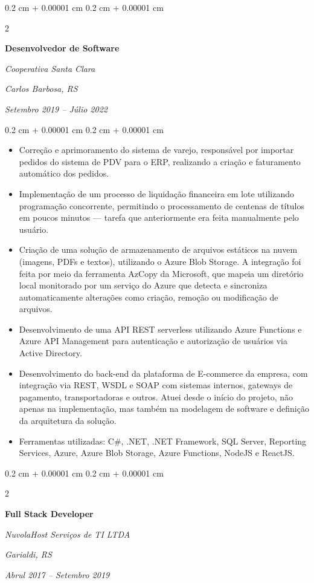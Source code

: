 \documentclass[10pt, letterpaper]{article}
\newenvironment{highlights}{
    \begin{itemize}[
        topsep=0.10 cm,
        parsep=0.10 cm,
        partopsep=0pt,
        itemsep=0pt,
        leftmargin=0.4 cm + 10pt
    ]
}{
    \end{itemize}
} %
\newenvironment{onecolentry}{
    \begin{adjustwidth}{
        0.2 cm + 0.00001 cm
    }{
        0.2 cm + 0.00001 cm
    }
}{
    \end{adjustwidth}
} %
\newenvironment{twocolentry}[2][]{
    \onecolentry
    \def\secondColumn{#2}
    \setcolumnwidth{\fill, 4.5 cm}
    \begin{paracol}{2}
}{
    \switchcolumn \raggedleft \secondColumn
    \end{paracol}
    \endonecolentry
} %
\begin{document}
        \begin{twocolentry}{
        \textit{Carlos Barbosa, RS}    
            
        \textit{Setembro 2019 – Júlio 2022}}
            \textbf{Desenvolvedor de Software}
            
            \textit{Cooperativa Santa Clara}
        \end{twocolentry}

        \vspace{0.10 cm}
        \begin{onecolentry}
            \begin{highlights}
                \item Correção e aprimoramento do sistema de varejo, responsável por importar pedidos do sistema de PDV para o ERP, realizando a criação e faturamento automático dos pedidos.
                \item Implementação de um processo de liquidação financeira em lote utilizando programação concorrente, permitindo o processamento de centenas de títulos em poucos minutos — tarefa que anteriormente era feita manualmente pelo usuário.
                \item Criação de uma solução de armazenamento de arquivos estáticos na nuvem (imagens, PDFs e textos), utilizando o Azure Blob Storage. A integração foi feita por meio da ferramenta AzCopy da Microsoft, que mapeia um diretório local monitorado por um serviço do Azure que detecta e sincroniza automaticamente alterações como criação, remoção ou modificação de arquivos.
                \item Desenvolvimento de uma API REST serverless utilizando Azure Functions e Azure API Management para autenticação e autorização de usuários via Active Directory.
                \item Desenvolvimento do back-end da plataforma de E-commerce da empresa, com integração via REST, WSDL e SOAP com sistemas internos, gateways de pagamento, transportadoras e outros. Atuei desde o início do projeto, não apenas na implementação, mas também na modelagem de software e definição da arquitetura da solução.
                \item Ferramentas utilizadas: C\#, .NET, .NET Framework, SQL Server, Reporting Services, Azure, Azure Blob Storage, Azure Functions, NodeJS e ReactJS.
            \end{highlights}
        \end{onecolentry}
        
        
        \begin{twocolentry}{
        \textit{Garialdi, RS}    
            
        \textit{Abrul 2017 – Setembro 2019}}
            \textbf{Full Stack Developer}
            
            \textit{NuvolaHost Serviços de TI LTDA}
        \end{twocolentry}
\end{document}
